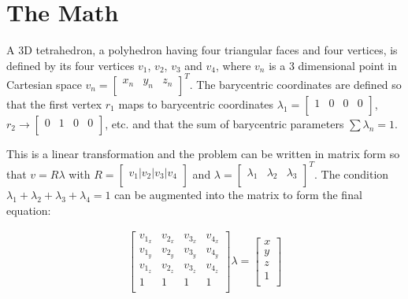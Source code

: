 \section{The Math}

A 3D tetrahedron,  a  polyhedron having four triangular faces and four vertices,
is defined  by its four vertices $v_1$, $v_2$, $v_3$ and $v_4$, where $v_n$ is a
3 dimensional point in Cartesian space $v_n = \begin{bmatrix} x_n & y_n & z_n \\
\end{bmatrix}^T$.  The  barycentric  coordinates  are defined so that the  first
vertex $r_1$ maps to barycentric coordinates $\lambda_1 = \begin{bmatrix} 1  & 0
&  0 & 0 \\ \end{bmatrix}$,  $r_2  \to  \begin{bmatrix}  0  &  1  &  0  &  0  \\
\end{bmatrix}$, etc. and that the sum of barycentric parameters $\sum\lambda_n
= 1$.

This is a linear transformation and the problem can be written in matrix form so
that  $v  =  R\lambda$ with $R=\begin{bmatrix} v_1|v_2|v_3|v_4 \\ \end{bmatrix}$
and  $\lambda  =  \begin{bmatrix}   \lambda_1   &   \lambda_2   &  \lambda_3  \\
\end{bmatrix}^T$. The condition $\lambda_1 + \lambda_2 + \lambda_3 + \lambda_4 =
1$ can be augmented into the matrix to form the final equation:

\begin{align}
    \label{eq:bary:cartesian}
    \begin{bmatrix}
        v_{1_x} & v_{2_x} & v_{3_x} & v_{4_x} \\
        v_{1_y} & v_{2_y} & v_{3_y} & v_{4_y} \\
        v_{1_z} & v_{2_z} & v_{3_z} & v_{4_z} \\
        1 & 1 & 1 & 1 \\
    \end{bmatrix}
    \lambda = \begin{bmatrix}
        x \\
        y \\
        z \\
        1 \\
    \end{bmatrix}
\end{align}

